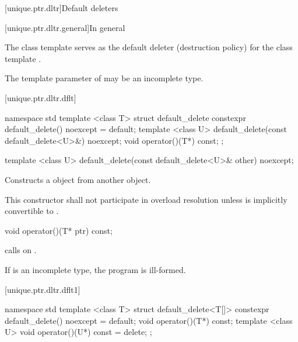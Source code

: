 [unique.ptr.dltr]{Default deleters}

[unique.ptr.dltr.general]{In general}

\pnum
The class template  serves as the default deleter (destruction policy)
for the class template .

\pnum
The template parameter  of  may be
an incomplete type.

[unique.ptr.dltr.dflt]{}

\begin{codeblock}
namespace std {
  template <class T> struct default_delete {
    constexpr default_delete() noexcept = default;
    template <class U> default_delete(const default_delete<U>&) noexcept;
    void operator()(T*) const;
  };
}
\end{codeblock}

\begin{itemdecl}
template <class U> default_delete(const default_delete<U>& other) noexcept;
\end{itemdecl}

\begin{itemdescr}
\pnum
\effects Constructs a  object
from another  object.

\pnum
\remarks This constructor shall not participate in overload resolution unless
 is implicitly convertible to .
\end{itemdescr}

\begin{itemdecl}
void operator()(T* ptr) const;
\end{itemdecl}

\begin{itemdescr}
\pnum
\effects calls  on .

\pnum
\notes If  is an incomplete type, the program is ill-formed.
\end{itemdescr}

[unique.ptr.dltr.dflt1]{}

\begin{codeblock}
namespace std {
  template <class T> struct default_delete<T[]> {
    constexpr default_delete() noexcept = default;
    void operator()(T*) const;
    template <class U> void operator()(U*) const = delete;
  };
}
\end{codeblock}

